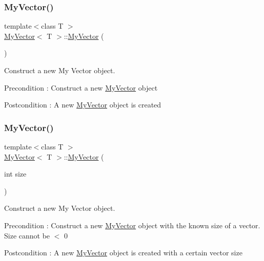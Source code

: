 \subsubsection{\texorpdfstring{MyVector()}{MyVector()}\hspace{0.1cm}{\footnotesize\ttfamily [1/4]}}
{\footnotesize\ttfamily template$<$class T $>$ \\
\mbox{\hyperlink{class_my_vector}{My\+Vector}}$<$ T $>$\+::\mbox{\hyperlink{class_my_vector}{My\+Vector}} (\begin{DoxyParamCaption}{ }\end{DoxyParamCaption})}



Construct a new My Vector object. 

\begin{DoxyPrecond}{Precondition}
\+: Construct a new \mbox{\hyperlink{class_my_vector}{My\+Vector}} object 
\end{DoxyPrecond}
\begin{DoxyPostcond}{Postcondition}
\+: A new \mbox{\hyperlink{class_my_vector}{My\+Vector}} object is created 
\end{DoxyPostcond}
\mbox{\label{class_my_vector_a9f780e2c6c6f35610a656b64395c6d1b}} 
\subsubsection{\texorpdfstring{MyVector()}{MyVector()}\hspace{0.1cm}{\footnotesize\ttfamily [2/4]}}
{\footnotesize\ttfamily template$<$class T $>$ \\
\mbox{\hyperlink{class_my_vector}{My\+Vector}}$<$ T $>$\+::\mbox{\hyperlink{class_my_vector}{My\+Vector}} (\begin{DoxyParamCaption}\item[{int}]{size }\end{DoxyParamCaption})}



Construct a new My Vector object. 

\begin{DoxyPrecond}{Precondition}
\+: Construct a new \mbox{\hyperlink{class_my_vector}{My\+Vector}} object with the known size of a vector. Size cannot be $<$ 0 
\end{DoxyPrecond}
\begin{DoxyPostcond}{Postcondition}
\+: A new \mbox{\hyperlink{class_my_vector}{My\+Vector}} object is created with a certain vector size 
\end{DoxyPostcond}

